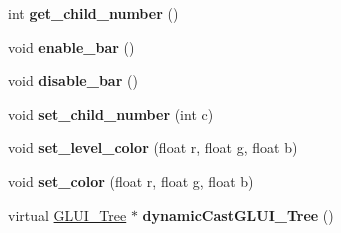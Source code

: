 \begin{DoxyCompactItemize}
\item 
\hypertarget{class_g_l_u_i___tree_a09d07235daca64350c7d253bb937732b}{int {\bfseries get\+\_\+child\+\_\+number} ()}\label{class_g_l_u_i___tree_a09d07235daca64350c7d253bb937732b}

\item 
\hypertarget{class_g_l_u_i___tree_a5d669dacda1b1edb9ada2fbce957e4ca}{void {\bfseries enable\+\_\+bar} ()}\label{class_g_l_u_i___tree_a5d669dacda1b1edb9ada2fbce957e4ca}

\item 
\hypertarget{class_g_l_u_i___tree_a7f39a382e4c3adc1634267de80276c7f}{void {\bfseries disable\+\_\+bar} ()}\label{class_g_l_u_i___tree_a7f39a382e4c3adc1634267de80276c7f}

\item 
\hypertarget{class_g_l_u_i___tree_a7b854371a9ab38f30bb83acc9d762b84}{void {\bfseries set\+\_\+child\+\_\+number} (int c)}\label{class_g_l_u_i___tree_a7b854371a9ab38f30bb83acc9d762b84}

\item 
\hypertarget{class_g_l_u_i___tree_a1b8694b525dcc72d11945c5d41565e2b}{void {\bfseries set\+\_\+level\+\_\+color} (float r, float g, float b)}\label{class_g_l_u_i___tree_a1b8694b525dcc72d11945c5d41565e2b}

\item 
\hypertarget{class_g_l_u_i___tree_a421127bfedefee3c5fb9c17202ca4bc7}{void {\bfseries set\+\_\+color} (float r, float g, float b)}\label{class_g_l_u_i___tree_a421127bfedefee3c5fb9c17202ca4bc7}

\item 
\hypertarget{class_g_l_u_i___tree_adf3bd825953e738f0f9e23e51eb8e736}{virtual \hyperlink{class_g_l_u_i___tree}{G\+L\+U\+I\+\_\+\+Tree} $\ast$ {\bfseries dynamic\+Cast\+G\+L\+U\+I\+\_\+\+Tree} ()}\label{class_g_l_u_i___tree_adf3bd825953e738f0f9e23e51eb8e736}

\end{DoxyCompactItemize}
